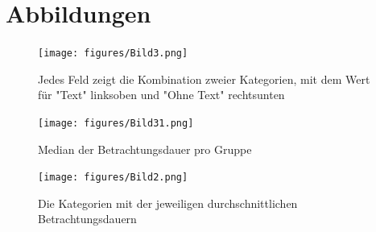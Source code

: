 \documentclass[
    language=german, %
    thesis=seminar, %
    supervisor=postdoc, %
    multiauthor=true, %
    ]{settings/csssa-thesis}
\begin{document}
\newpage
\printbibliography[heading=header]

\clearpage
\appendix
\section{Abbildungen}


\begin{figure}[htbp]
    \centering
    \texttt{[image: figures/Bild3.png]}
    \caption{Jedes Feld zeigt die Kombination zweier Kategorien, mit dem Wert für "Text" linksoben und "Ohne Text" rechtsunten}\label{fig:katMatrix}
\end{figure}

\begin{figure}[htbp]
    \centering
    \texttt{[image: figures/Bild31.png]}
    \caption{Median der Betrachtungsdauer pro Gruppe}
    \label{fig:bild27}
\end{figure}

\begin{figure}[htbp]
    \centering
    \texttt{[image: figures/Bild2.png]}
    \caption{Die Kategorien mit der jeweiligen durchschnittlichen Betrachtungsdauern}\label{fig:katDauer}
\end{figure}
\end{document}
